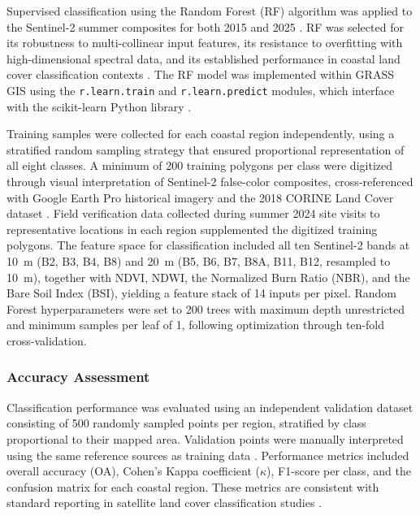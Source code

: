 \documentclass[remotesensing,article,submit,pdftex,moreauthors]{Definitions/mdpi}
\begin{document}
Supervised classification using the Random Forest (RF) algorithm was applied to the Sentinel-2 summer composites for both 2015 and 2025 \citep{RF_Czechia2022, Yancheng2024}. RF was selected for its robustness to multi-collinear input features, its resistance to overfitting with high-dimensional spectral data, and its established performance in coastal land cover classification contexts \citep{Cherian2024, VegPortugal2022}. The RF model was implemented within GRASS GIS using the \texttt{r.learn.train} and \texttt{r.learn.predict} modules, which interface with the scikit-learn Python library \citep{Lemenkova2023ML, Lemenkova2025Morocco}.

Training samples were collected for each coastal region independently, using a stratified random sampling strategy that ensured proportional representation of all eight classes. A minimum of 200 training polygons per class were digitized through visual interpretation of Sentinel-2 false-color composites, cross-referenced with Google Earth Pro historical imagery and the 2018 CORINE Land Cover dataset \citep{EEA_CLC2018}. Field verification data collected during summer 2024 site visits to representative locations in each region supplemented the digitized training polygons. The feature space for classification included all ten Sentinel-2 bands at 10~m (B2, B3, B4, B8) and 20~m (B5, B6, B7, B8A, B11, B12, resampled to 10~m), together with NDVI, NDWI, the Normalized Burn Ratio (NBR), and the Bare Soil Index (BSI), yielding a feature stack of 14 inputs per pixel. Random Forest hyperparameters were set to 200 trees with maximum depth unrestricted and minimum samples per leaf of 1, following optimization through ten-fold cross-validation.

\subsubsection{Accuracy Assessment}

Classification performance was evaluated using an independent validation dataset consisting of 500 randomly sampled points per region, stratified by class proportional to their mapped area. Validation points were manually interpreted using the same reference sources as training data \citep{RF_Czechia2022}. Performance metrics included overall accuracy (OA), Cohen's Kappa coefficient ($\kappa$), F1-score per class, and the confusion matrix for each coastal region. These metrics are consistent with standard reporting in satellite land cover classification studies \citep{Cherian2024, Lemenkova202505, Lemenkova202411}.
\end{document}
